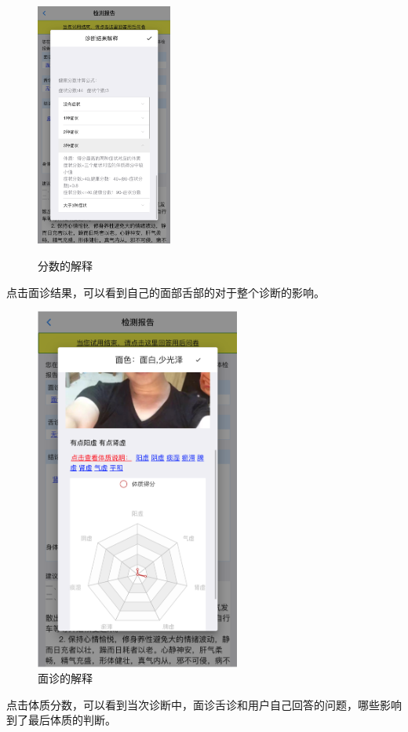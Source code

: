 \begin{figure}[ht]
{        \includegraphics[height=8cm]{images/report9.png}
    }
    \caption{分数的解释}
    \label{fig:report_expalin_score}
\end{figure}

点击面诊结果，可以看到自己的面部舌部的对于整个诊断的影响。
\begin{figure}[ht]
    \centering
    \includegraphics[height=12cm]{images/report4.png}
    \caption{面诊的解释}
    \label{fig:my_label}
\end{figure}

点击体质分数，可以看到当次诊断中，面诊舌诊和用户自己回答的问题，哪些影响到了最后体质的判断。


